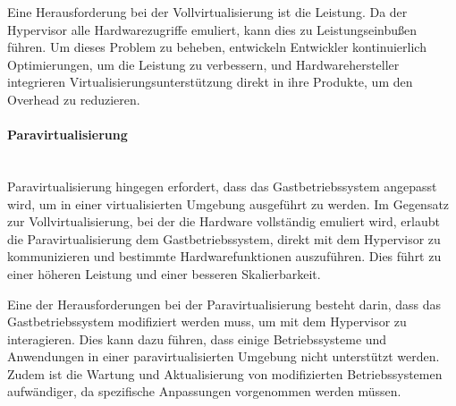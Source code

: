 \documentclass[../vs-script-first-v01.tex]{subfiles}
\begin{document}
Eine Herausforderung bei der Vollvirtualisierung ist die Leistung. Da der Hypervisor alle Hardwarezugriffe emuliert, kann dies zu Leistungseinbußen führen. Um dieses Problem zu beheben, entwickeln Entwickler kontinuierlich Optimierungen, um die Leistung zu verbessern, und Hardwarehersteller integrieren Virtualisierungsunterstützung direkt in ihre Produkte, um den Overhead zu reduzieren.
\paragraph{Paravirtualisierung\\\\}
Paravirtualisierung hingegen erfordert, dass das Gastbetriebssystem angepasst wird, um in einer virtualisierten Umgebung ausgeführt zu werden. Im Gegensatz zur Vollvirtualisierung, bei der die Hardware vollständig emuliert wird, erlaubt die Paravirtualisierung dem Gastbetriebssystem, direkt mit dem Hypervisor zu kommunizieren und bestimmte Hardwarefunktionen auszuführen. Dies führt zu einer höheren Leistung und einer besseren Skalierbarkeit.

Eine der Herausforderungen bei der Paravirtualisierung besteht darin, dass das Gastbetriebssystem modifiziert werden muss, um mit dem Hypervisor zu interagieren. Dies kann dazu führen, dass einige Betriebssysteme und Anwendungen in einer paravirtualisierten Umgebung nicht unterstützt werden. Zudem ist die Wartung und Aktualisierung von modifizierten Betriebssystemen aufwändiger, da spezifische Anpassungen vorgenommen werden müssen.
\end{document}

